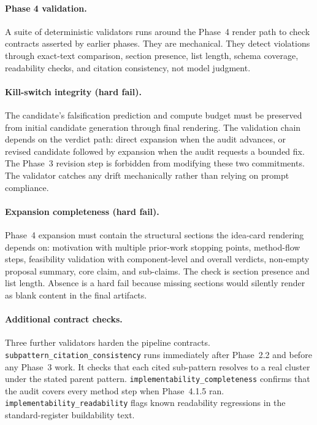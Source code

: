 \documentclass[10pt,a4paper]{article}
\begin{document}
\paragraph{Phase 4 validation.} A suite of deterministic validators runs around the Phase~4 render path to check contracts asserted by earlier phases. They are mechanical. They detect violations through exact-text comparison, section presence, list length, schema coverage, readability checks, and citation consistency, not model judgment.

\paragraph{Kill-switch integrity (hard fail).} The candidate's falsification prediction and compute budget must be preserved from initial candidate generation through final rendering. The validation chain depends on the verdict path: direct expansion when the audit advances, or revised candidate followed by expansion when the audit requests a bounded fix. The Phase~3 revision step is forbidden from modifying these two commitments. The validator catches any drift mechanically rather than relying on prompt compliance.

\paragraph{Expansion completeness (hard fail).} Phase~4 expansion must contain the structural sections the idea-card rendering depends on: motivation with multiple prior-work stopping points, method-flow steps, feasibility validation with component-level and overall verdicts, non-empty proposal summary, core claim, and sub-claims. The check is section presence and list length. Absence is a hard fail because missing sections would silently render as blank content in the final artifacts.

\paragraph{Additional contract checks.} Three further validators harden the pipeline contracts. \texttt{subpattern\_citation\_consistency} runs immediately after Phase~2.2 and before any Phase~3 work. It checks that each cited sub-pattern resolves to a real cluster under the stated parent pattern. \texttt{implementability\_completeness} confirms that the audit covers every method step when Phase~4.1.5 ran. \texttt{implementability\_readability} flags known readability regressions in the standard-register buildability text.
\end{document}
